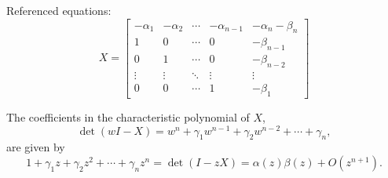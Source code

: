 Referenced equations:
\begin{equation}\label{550a}
X = \begin{bmatrix}
-\alpha_1 & -\alpha_2 & \cdots & -\alpha_{n-1} & -\alpha_n - \beta_n \\
1 & 0 & \cdots & 0 & -\beta_{n-1} \\
0 & 1 & \cdots & 0 & -\beta_{n-2} \\
\vdots & \vdots & \ddots & \vdots & \vdots \\
0 & 0 & \cdots & 1 & -\beta_1
\end{bmatrix}
\end{equation}

\begin{theorem}

  \label{thm:550A}
The coefficients in the characteristic polynomial of \(X\),
\[
\det(wI - X) = w^n + \gamma_1 w^{n-1} + \gamma_2 w^{n-2} + \cdots + \gamma_n,
\]
are given by
\[
1 + \gamma_1 z + \gamma_2 z^2 + \cdots + \gamma_n z^n = \det(I - zX) = \alpha(z)\beta(z) + O(z^{n+1}).
\]
\end{theorem}

